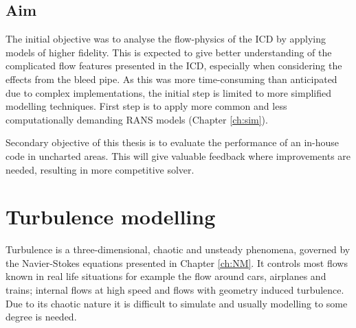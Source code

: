 \section{Aim}
The initial objective was to analyse the flow-physics of the ICD by applying models of higher fidelity. This is expected to give better understanding of the complicated flow features presented in the ICD, especially when considering the effects from the bleed pipe. As this was more time-consuming than anticipated due to complex implementations, the initial step is limited to more simplified modelling techniques. First step is to apply more common and less computationally demanding RANS models (Chapter \ref{ch:sim}).

Secondary objective of this thesis is to evaluate the performance of an in-house code in uncharted areas. This will give valuable feedback where improvements are needed, resulting in more competitive solver.

\chapter{Turbulence modelling\label{ch:Turbulence}}
Turbulence is a three-dimensional, chaotic and unsteady phenomena, governed by the Navier-Stokes equations presented in Chapter \ref{ch:NM}. It controls most flows known in real life situations for example the flow around cars, airplanes and trains; internal flows at high speed and flows with geometry induced turbulence. Due to its chaotic nature it is difficult to simulate and usually modelling to some degree is needed.

